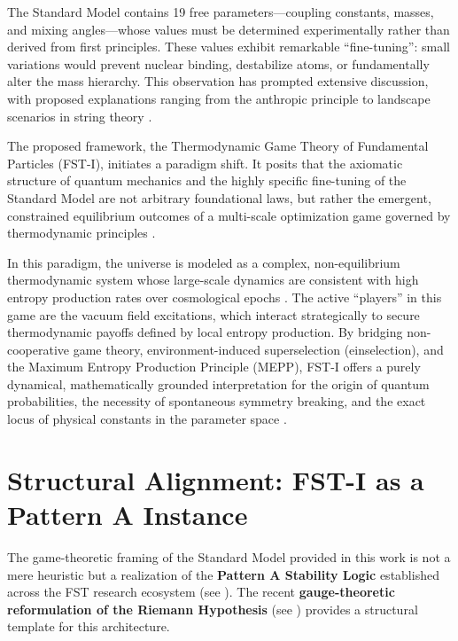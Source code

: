 \documentclass[12pt,a4paper]{article}
\theoremstyle{remark}
\begin{document}
The Standard Model contains 19 free parameters---coupling constants, masses, and mixing angles---whose values must be determined experimentally rather than derived from first principles. These values exhibit remarkable ``fine-tuning'': small variations would prevent nuclear binding, destabilize atoms, or fundamentally alter the mass hierarchy. This observation has prompted extensive discussion, with proposed explanations ranging from the anthropic principle \citep{Weinberg1987,Susskind2005} to landscape scenarios in string theory \citep{Bousso2000}.

The proposed framework, the Thermodynamic Game Theory of Fundamental Particles (FST-I), initiates a paradigm shift. It posits that the axiomatic structure of quantum mechanics and the highly specific fine-tuning of the Standard Model are not arbitrary foundational laws, but rather the emergent, constrained equilibrium outcomes of a multi-scale optimization game governed by thermodynamic principles \citep{QuantumStrategies2024}.

In this paradigm, the universe is modeled as a complex, non-equilibrium thermodynamic system whose large-scale dynamics are consistent with high entropy production rates over cosmological epochs \citep{MEPP2010}. The active ``players'' in this game are the vacuum field excitations, which interact strategically to secure thermodynamic payoffs defined by local entropy production. By bridging non-cooperative game theory, environment-induced superselection (einselection), and the Maximum Entropy Production Principle (MEPP), FST-I offers a purely dynamical, mathematically grounded interpretation for the origin of quantum probabilities, the necessity of spontaneous symmetry breaking, and the exact locus of physical constants in the parameter space \citep{HiggsVEV2024}.

\section{Structural Alignment: FST-I as a Pattern A Instance}
\label{sec:structural-alignment}

The game-theoretic framing of the Standard Model provided in this work is not a mere heuristic but a realization of the \textbf{Pattern A Stability Logic} established across the FST research ecosystem (see \cite{FST-Unified2026}). The recent \textbf{gauge-theoretic reformulation of the Riemann Hypothesis} (see \cite{GeigerRH2026c}) provides a structural template for this architecture.
\end{document}
